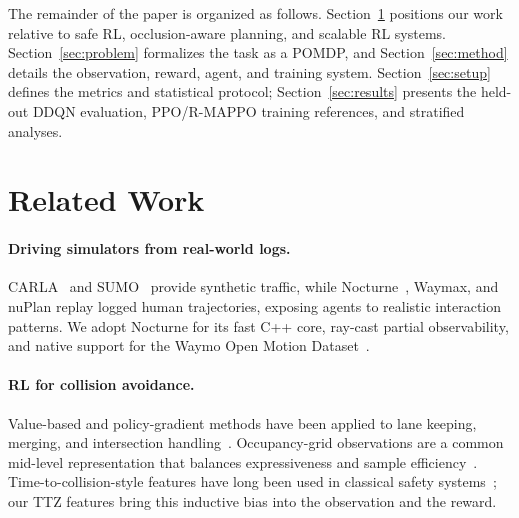 \documentclass{article}
\begin{document}
The remainder of the paper is organized as follows. Section~\ref{sec:related}
positions our work relative to safe RL, occlusion-aware planning, and
scalable RL systems. Section~\ref{sec:problem} formalizes the task as a
POMDP, and Section~\ref{sec:method} details the observation, reward, agent,
and training system. Section~\ref{sec:setup} defines the metrics and
statistical protocol; Section~\ref{sec:results} presents the held-out DDQN
evaluation, PPO/R-MAPPO training references, and stratified analyses.

\section{Related Work}
\label{sec:related}

\paragraph{Driving simulators from real-world logs.}
CARLA~\citep{dosovitskiy2017carla} and SUMO~\citep{lopez2018sumo} provide
synthetic traffic, while Nocturne~\citep{vinitsky2022nocturne}, Waymax, and
nuPlan replay logged human trajectories, exposing agents to realistic
interaction patterns. We adopt Nocturne for its fast C++ core, ray-cast
partial observability, and native support for the Waymo Open Motion
Dataset~\citep{ettinger2021waymo}.

\paragraph{RL for collision avoidance.}
Value-based and policy-gradient methods have been applied to lane keeping,
merging, and intersection handling~\citep{kiran2021deep, isele2018navigating}.
Occupancy-grid observations are a common mid-level representation that
balances expressiveness and sample efficiency~\citep{fridman2018deeptraffic}.
Time-to-collision-style features have long been used in classical
safety systems~\citep{minderhoud2001extended}; our TTZ features bring this
inductive bias into the observation and the reward.
\end{document}
